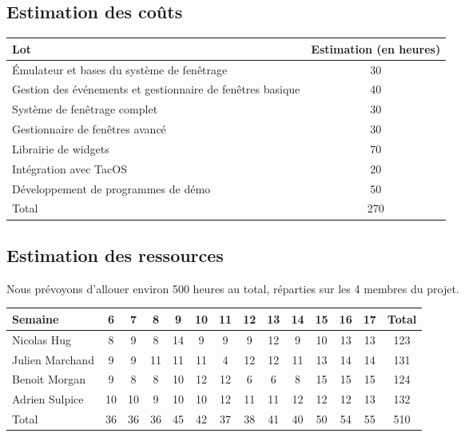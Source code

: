 \subsection{Estimation des coûts}

\begin{tabular}{|l|c|}
  \hline
  \rowcolor{dark_grey} Lot & Estimation (en heures) \\
  \hline
  Émulateur et bases du système de fenêtrage & 30 \\
  \hline
  Gestion des événements et gestionnaire de fenêtres basique & 40 \\
  \hline
  Système de fenêtrage complet & 30 \\
  \hline
  Gestionnaire de fenêtres avancé & 30 \\
  \hline
  Librairie de widgets  & 70 \\
  \hline
  Intégration avec TacOS & 20 \\
  \hline
  Développement de programmes de démo & 50 \\
  \hline
  \rowcolor{dark_grey} Total & 270 \\
  \hline
\end{tabular}

\subsection{Estimation des ressources}

Nous prévoyons d'allouer environ 500 heures au total, réparties sur les 4 membres du projet.

\begin{tabular}{|l|c|c|c|c|c|c|c|c|c|c|c|c|c|}
  \hline
  \rowcolor{dark_grey} Semaine           &   6   &   7   &   8   &   9     &   10  &   11  &   12  &   13    &   14  &   15    &   16    &   17    &  Total \\
  \hline
  Nicolas Hug       &   8   &   9   &   8   &   14    &   9   &   9   &   9   &   12    &   9   &   10    &   13    &   13    &   123 \\
  \hline
  Julien Marchand   &   9   &   9   &   11  &   11    &   11  &   4   &   12  &   12    &   11  &   13    &   14    &   14    &   131 \\
  \hline
  Benoit Morgan     &   9   &   8   &   8   &   10    &   12  &   12  &   6   &   6     &   8   &   15    &   15    &   15    &   124 \\
  \hline
  Adrien Sulpice    &   10  &   10  &   9   &   10    &   10  &   12  &   11  &   11    &   12  &   12    &   12    &   13    &   132 \\
  \hline
  \rowcolor{dark_grey} Total             &   36  &   36  &   36  &   45    &   42  &   37  &   38  &   41    &   40  &   50    &   54    &   55    &   510  \\
  \hline
\end{tabular}


